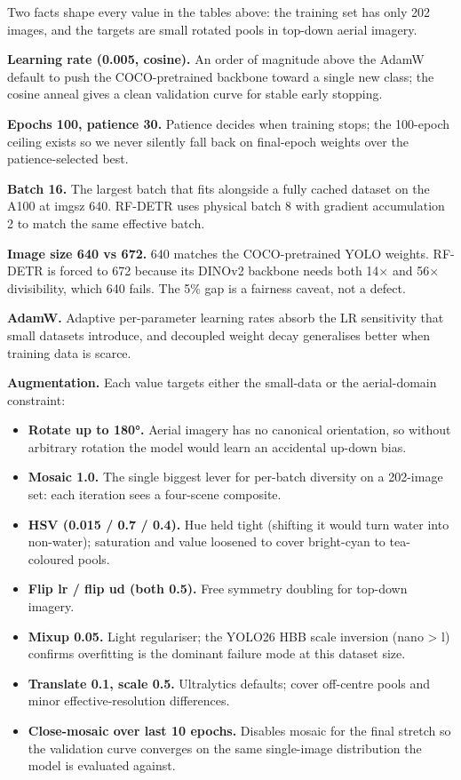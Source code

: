 \documentclass[11pt
]{article}
\providecommand{\tightlist}{%
  \setlength{\itemsep}{0pt}\setlength{\parskip}{0pt}}
\begin{document}
Two facts shape every value in the tables above: the training set has
only 202 images, and the targets are small rotated pools in top-down
aerial imagery.

\textbf{Learning rate (0.005, cosine).} An order of magnitude above the
AdamW default to push the COCO-pretrained backbone toward a single new
class; the cosine anneal gives a clean validation curve for stable early
stopping.

\textbf{Epochs 100, patience 30.} Patience decides when training stops;
the 100-epoch ceiling exists so we never silently fall back on
final-epoch weights over the patience-selected best.

\textbf{Batch 16.} The largest batch that fits alongside a fully cached
dataset on the A100 at imgsz 640. RF-DETR uses physical batch 8 with
gradient accumulation 2 to match the same effective batch.

\textbf{Image size 640 vs 672.} 640 matches the COCO-pretrained YOLO
weights. RF-DETR is forced to 672 because its DINOv2 backbone needs both
14× and 56× divisibility, which 640 fails. The 5\% gap is a fairness
caveat, not a defect.

\textbf{AdamW.} Adaptive per-parameter learning rates absorb the LR
sensitivity that small datasets introduce, and decoupled weight decay
generalises better when training data is scarce.

\textbf{Augmentation.} Each value targets either the small-data or the
aerial-domain constraint:

\begin{itemize}
\tightlist
\item
  \textbf{Rotate up to 180°.} Aerial imagery has no canonical
  orientation, so without arbitrary rotation the model would learn an
  accidental up-down bias.
\item
  \textbf{Mosaic 1.0.} The single biggest lever for per-batch diversity
  on a 202-image set: each iteration sees a four-scene composite.
\item
  \textbf{HSV (0.015 / 0.7 / 0.4).} Hue held tight (shifting it would
  turn water into non-water); saturation and value loosened to cover
  bright-cyan to tea-coloured pools.
\item
  \textbf{Flip lr / flip ud (both 0.5).} Free symmetry doubling for
  top-down imagery.
\item
  \textbf{Mixup 0.05.} Light regulariser; the YOLO26 HBB scale inversion
  (nano \textgreater{} l) confirms overfitting is the dominant failure
  mode at this dataset size.
\item
  \textbf{Translate 0.1, scale 0.5.} Ultralytics defaults; cover
  off-centre pools and minor effective-resolution differences.
\item
  \textbf{Close-mosaic over last 10 epochs.} Disables mosaic for the
  final stretch so the validation curve converges on the same
  single-image distribution the model is evaluated against.
\end{itemize}
\end{document}
